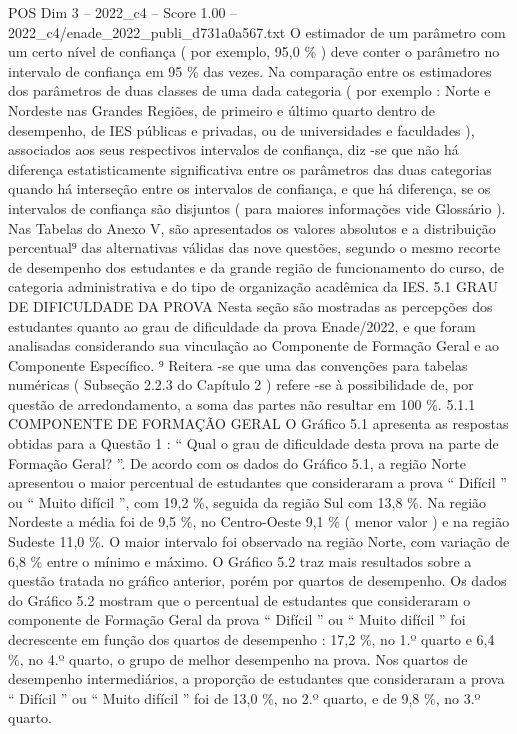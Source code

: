 \begin{textsample}{POS Dim 3 – 2022\_c4 – Score 1.00 – 2022\_c4/enade\_2022\_publi\_d731a0a567.txt}
O estimador de um parâmetro com um certo nível de confiança ( por exemplo, 95,0 \% ) deve conter o parâmetro no intervalo de confiança em 95 \% das vezes.
Na comparação entre os estimadores dos parâmetros de duas classes de uma dada categoria ( por exemplo : Norte e Nordeste nas Grandes Regiões, de primeiro e último quarto dentro de desempenho, de IES públicas e privadas, ou de universidades e faculdades ), associados aos seus respectivos intervalos de confiança, diz -se que não há diferença estatisticamente significativa entre os parâmetros das duas categorias quando há interseção entre os intervalos de confiança, e que há diferença, se os intervalos de confiança são disjuntos ( para maiores informações vide Glossário ).
Nas Tabelas do Anexo V, são apresentados os valores absolutos e a distribuição percentual⁹ das alternativas válidas das nove questões, segundo o mesmo recorte de desempenho dos estudantes e da grande região de funcionamento do curso, de categoria administrativa e do tipo de organização acadêmica da IES. 5.1 GRAU DE DIFICULDADE DA PROVA Nesta seção são mostradas as percepções dos estudantes quanto ao grau de dificuldade da prova Enade/2022, e que foram analisadas considerando sua vinculação ao Componente de Formação Geral e ao Componente Específico. ⁹ Reitera -se que uma das convenções para tabelas numéricas ( Subseção 2.2.3 do Capítulo 2 ) refere -se à possibilidade de, por questão de arredondamento, a soma das partes não resultar em 100 \%. 5.1.1 COMPONENTE DE FORMAÇÃO GERAL O Gráfico 5.1 apresenta as respostas obtidas para a Questão 1 : “ Qual o grau de dificuldade desta prova na parte de Formação Geral? ”.
De acordo com os dados do Gráfico 5.1, a região Norte apresentou o maior percentual de estudantes que consideraram a prova “ Difícil ” ou “ Muito difícil ”, com 19,2 \%, seguida da região Sul com 13,8 \%.
Na região Nordeste a média foi de 9,5 \%, no Centro-Oeste 9,1 \% ( menor valor ) e na região Sudeste 11,0 \%.
O maior intervalo foi observado na região Norte, com variação de 6,8 \% entre o mínimo e máximo.
O Gráfico 5.2 traz mais resultados sobre a questão tratada no gráfico anterior, porém por quartos de desempenho.
Os dados do Gráfico 5.2 mostram que o percentual de estudantes que consideraram o componente de Formação Geral da prova “ Difícil ” ou “ Muito difícil ” foi decrescente em função dos quartos de desempenho : 17,2 \%, no 1.º quarto e 6,4 \%, no 4.º quarto, o grupo de melhor desempenho na prova.
Nos quartos de desempenho intermediários, a proporção de estudantes que consideraram a prova “ Difícil ” ou “ Muito difícil ” foi de 13,0 \%, no 2.º quarto, e de 9,8 \%, no 3.º quarto.

\end{textsample}
